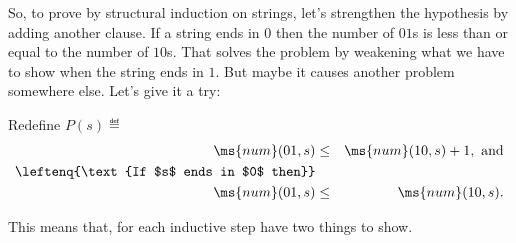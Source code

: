 \begin{definition}
So, to prove by structural induction on strings, let's strengthen the
hypothesis by adding another clause.  If a string ends in $0$ then
the number of $01$s is less than or equal to the number of $10$s.
That solves the problem by weakening what we have to show when the
string ends in $1$.  But maybe it causes another problem somewhere
else.  Let's give it a try:

Redefine $P(s) \eqdef$
\begin{eqnarray*}
\ms{num}(01,s) & \leq & \ms{num}(10,s) + 1, \text{ and}\\
\leftenq{\text{If $s$ ends in $0$ then}}\\
\ms{num}(01,s) & \leq  &\ms{num}(10,s).
\end{eqnarray*} 
 
This means that, for each inductive step have two things to show.



\end{definition}

